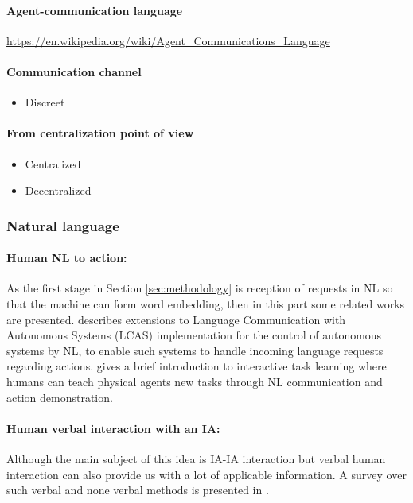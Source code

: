 \documentclass{article}
\begin{document}
			\paragraph{Agent-communication language} \url{https://en.wikipedia.org/wiki/Agent_Communications_Language}
			\paragraph{Communication channel}
			\begin{itemize}
				\item Discreet
			\end{itemize}	
			\paragraph{From centralization point of view}
			\begin{itemize}
				\item Centralized
				\item Decentralized
			\end{itemize}
			
			\subsubsection{Natural language}
				\paragraph{Human NL to action:}
				As the first stage in Section \ref{sec:methodology} is reception of requests in NL so that the machine can form word embedding, then in this part some related works are presented. \cite{doubleday-2016-processing-natural-language-about-ongoing-actions} describes extensions to Language Communication with Autonomous Systems (LCAS) implementation for the control of autonomous systems by NL, to enable such systems to handle incoming language requests regarding actions. \cite{chai-2018-language-to-action-towards-interactive-task-learning-with-physical-agents} gives a brief introduction to interactive task learning where humans can teach physical agents new tasks through NL communication and action demonstration.
				
				\paragraph{Human verbal interaction with an IA:} Although the main subject of this idea is IA-IA interaction but verbal human interaction can also provide us with a lot of applicable information. A survey over such verbal and none verbal methods is presented in \cite{mavridis-2015-a-review-of-verbal-and-non-verbal-human-robot-interactive-communication}.
		
\end{document}
